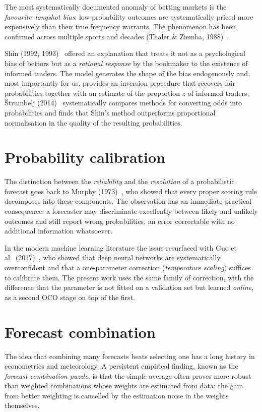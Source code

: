 \documentclass[12pt,a4paper,oneside]{report}
\renewcommand{\_}{\oldunderscore\allowbreak}
\theoremstyle{definition}
\theoremstyle{plain}
\theoremstyle{definition}   %
\begin{document}
The most systematically documented anomaly of betting markets is the
\emph{favourite--longshot bias}: low-probability outcomes are systematically priced more
expensively than their true frequency warrants. The phenomenon has been confirmed across
multiple sports and decades (Thaler \& Ziemba, 1988)~\cite{thalerziemba1988}.

Shin (1992, 1993)~\cite{shin1992,shin1993} offered an explanation that treats it not as a psychological bias of bettors
but as a \emph{rational response} by the bookmaker to the existence of informed traders. The
model generates the shape of the bias endogenously and, most importantly for us, provides an
inversion procedure that recovers fair probabilities together with an estimate of the
proportion $z$ of informed traders. Štrumbelj (2014)~\cite{strumbelj2014} systematically compares methods for
converting odds into probabilities and finds that Shin's method outperforms proportional
normalisation in the quality of the resulting probabilities.

\section{Probability calibration}

The distinction between the \emph{reliability} and the \emph{resolution} of a probabilistic
forecast goes back to Murphy (1973)~\cite{murphy1973}, who showed that every proper scoring rule decomposes into
these components. The observation has an immediate practical consequence: a forecaster may
discriminate excellently between likely and unlikely outcomes and still report wrong
probabilities, an error correctable with no additional information whatsoever.

In the modern machine learning literature the issue resurfaced with Guo et al.\ (2017)~\cite{guo2017}, who
showed that deep neural networks are systematically overconfident and that a one-parameter
correction (\emph{temperature scaling}) suffices to calibrate them. The present work uses the
same family of correction, with the difference that the parameter is not fitted on a validation
set but learned \emph{online}, as a second OCO stage on top of the first.

\section{Forecast combination}

The idea that combining many forecasts beats selecting one has a long history in econometrics
and meteorology. A persistent empirical finding, known as the \emph{forecast combination
puzzle}, is that the simple average often proves more robust than weighted combinations whose
weights are estimated from data: the gain from better weighting is cancelled by the estimation
noise in the weights themselves.
\end{document}
